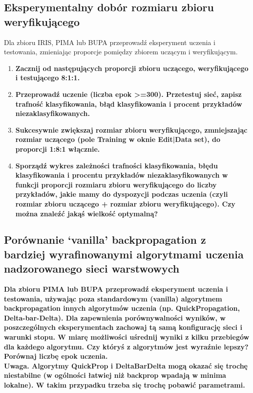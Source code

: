 \subsection{ Eksperymentalny dobór rozmiaru zbioru weryfikującego}
Dla zbioru IRIS, PIMA lub BUPA przeprowadź eksperyment uczenia i testowania, zmieniając proporcje pomiędzy zbiorem uczącym i weryfikującym.
\begin{enumerate}
\item \textbf{Zacznij od następujących proporcji zbioru uczącego, weryfikującego i testującego 8:1:1.}

\item \textbf{
Przeprowadź uczenie (liczba epok >=300). Przetestuj sieć, zapisz trafność klasyfikowania, błąd klasyfikowania i procent przykładów niezaklasyfikowanych.}

\item \textbf{
Sukcesywnie zwiększaj rozmiar zbioru weryfikującego, zmniejszając rozmiar uczącego (pole Training w oknie Edit|Data set), do proporcji 1:8:1 włącznie.}

\item \textbf{
Sporządź wykres zależności trafności klasyfikowania, błędu klasyfikowania i procentu przykładów niezaklasyfikowanych w funkcji proporcji rozmiaru zbioru weryfikującego do liczby przykładów, jakie mamy do dyspozycji podczas uczenia (czyli rozmiar zbioru uczącego + rozmiar zbioru weryfikującego). Czy można znaleźć jakąś wielkość optymalną?
}
\end{enumerate}

\subsection{Porównanie ‘vanilla’ backpropagation z bardziej wyrafinowanymi algorytmami uczenia nadzorowanego sieci warstwowych}
\textbf{Dla zbioru PIMA lub BUPA przeprowadź eksperyment uczenia i testowania, używając poza standardowym (vanilla) algorytmem backpropagation innych algorytmów uczenia (np. QuickPropagation, Delta-bar-Delta). Dla zapewnienia porównywalności wyników, w poszczególnych eksperymentach zachowaj tą samą konfigurację sieci i warunki stopu. W miarę możliwości uśrednij wyniki z kilku przebiegów dla każdego algorytmu. Czy któryś z algorytmów jest wyraźnie lepszy? Porównaj liczbę epok uczenia.
\\
Uwaga. Algorytmy QuickProp i DeltaBarDelta mogą okazać się trochę niestabilne (w ogólności łatwiej niż backprop wpadają w minima lokalne). W takim przypadku trzeba się trochę pobawić parametrami.}


